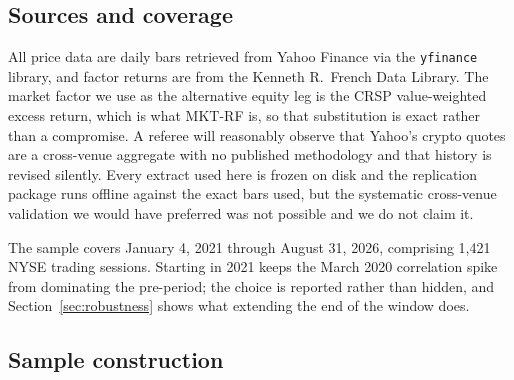 \documentclass[12pt,a4paper]{article}
\begin{document}
\subsection{Sources and coverage}

All price data are daily bars retrieved from Yahoo Finance via the \texttt{yfinance} library, and factor returns are from the Kenneth R.\ French Data Library. The market factor we use as the alternative equity leg is the CRSP value-weighted excess return, which is what MKT-RF is, so that substitution is exact rather than a compromise. A referee will reasonably observe that Yahoo's crypto quotes are a cross-venue aggregate with no published methodology and that history is revised silently. Every extract used here is frozen on disk and the replication package runs offline against the exact bars used, but the systematic cross-venue validation we would have preferred was not possible and we do not claim it.

The sample covers
January 4, 2021 through
August 31, 2026, comprising
1{,}421 NYSE trading sessions. Starting in 2021 keeps the March 2020 correlation spike from dominating the pre-period; the choice is reported rather than hidden, and Section~\ref{sec:robustness} shows what extending the end of the window does.

\subsection{Sample construction}
\end{document}
